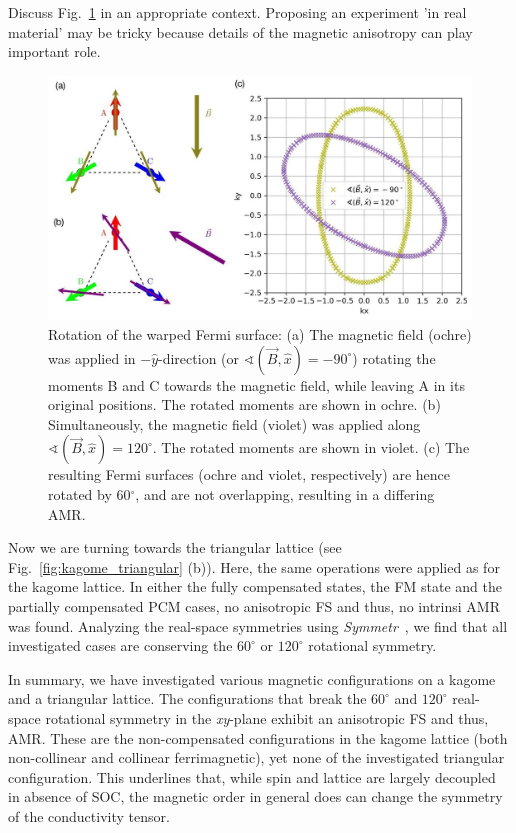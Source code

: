 \documentclass[prb,showpacs,amsmath,amssymb,superscriptaddress,twocolumn,floatfix]{revtex4-1}
\begin{document}
{\color{red} Discuss Fig.~\ref{fig:fs-rotation} in an appropriate context.} 
Proposing an experiment 'in real material' may be tricky because details of the
magnetic anisotropy can play important role.

\begin{figure}
	\centering
	\includegraphics[width=1\linewidth]{img/FS-rotation}
	\caption{Rotation of the warped Fermi surface: 
		(a) The magnetic field (ochre) was applied in $-\hat{y}$-direction (or $\sphericalangle (\vec{B}, \hat{x}) = -90^\circ$) rotating the moments B and C towards the magnetic field, while leaving A in its original positions. The rotated moments are shown in ochre. (b) Simultaneously, the magnetic field (violet) was applied along $\sphericalangle (\vec{B}, \hat{x}) = 120^\circ$. The rotated moments are shown in violet. (c) The resulting Fermi surfaces (ochre and violet, respectively) are hence rotated by 60$^\circ$, and are not overlapping, resulting in a differing AMR.}
	\label{fig:fs-rotation}
\end{figure}

Now we are turning towards the triangular lattice (see Fig.~\ref{fig:kagome_triangular} (b)). Here, the same operations were applied as for the kagome lattice. In either the fully compensated states, the FM state and the {\color{blue} partially compensated PCM} cases, no anisotropic FS and thus, no intrinsi AMR was found. Analyzing the real-space symmetries using \textit{Symmetr}~\cite{Symmetr}, we find that all investigated cases are conserving the $60^\circ$ or $120^\circ$ rotational symmetry. 

In summary, we have investigated various magnetic configurations on a kagome and a triangular lattice. The configurations that break the $60^\circ$ and $120^\circ$ real-space rotational symmetry in the \textit{xy}-plane exhibit an anisotropic FS and thus, AMR. These are the non-compensated configurations in the kagome lattice (both non-collinear and collinear ferrimagnetic), yet none of the investigated triangular configuration. This underlines that, while spin and lattice are largely decoupled~\cite{Gonzalez-Hernandez:2024} in absence of SOC, the magnetic order in general does can change the symmetry of the conductivity tensor.
\end{document}
